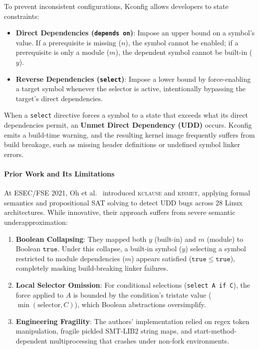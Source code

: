 \documentclass[acmsmall,screen,review,nonacm]{acmart}
\begin{document}
To prevent inconsistent configurations, Kconfig allows developers to state constraints:
\begin{itemize}
    \item \textbf{Direct Dependencies (\texttt{depends on})}: Impose an upper bound on a symbol's value. If a prerequisite is missing ($n$), the symbol cannot be enabled; if a prerequisite is only a module ($m$), the dependent symbol cannot be built-in ($y$).
    \item \textbf{Reverse Dependencies (\texttt{select})}: Impose a lower bound by force-enabling a target symbol whenever the selector is active, intentionally bypassing the target's direct dependencies.
\end{itemize}

When a \texttt{select} directive forces a symbol to a state that exceeds what its direct dependencies permit, an \textbf{Unmet Direct Dependency (UDD)} occurs. Kconfig emits a build-time warning, and the resulting kernel image frequently suffers from build breakage, such as missing header definitions or undefined symbol linker errors.

\paragraph{Prior Work and Its Limitations}
At ESEC/FSE 2021, Oh et al.~\cite{oh2021finding} introduced \textsc{kclause} and \textsc{kismet}, applying formal semantics and propositional SAT solving to detect UDD bugs across 28 Linux architectures. While innovative, their approach suffers from severe semantic underapproximation:
\begin{enumerate}
    \item \textbf{Boolean Collapsing}: They mapped both $y$ (built-in) and $m$ (module) to Boolean $\mathtt{true}$. Under this collapse, a built-in symbol ($y$) selecting a symbol restricted to module dependencies ($m$) appears satisfied ($\mathtt{true} \le \mathtt{true}$), completely masking build-breaking linker failures.
    \item \textbf{Local Selector Omission}: For conditional selections (\texttt{select A if C}), the force applied to $A$ is bounded by the condition's tristate value ($\min(\text{selector}, C)$), which Boolean abstractions oversimplify.
    \item \textbf{Engineering Fragility}: The authors' implementation relied on regex token manipulation, fragile pickled SMT-LIB2 string maps, and start-method-dependent multiprocessing that crashes under non-fork environments.
\end{enumerate}
\end{document}
